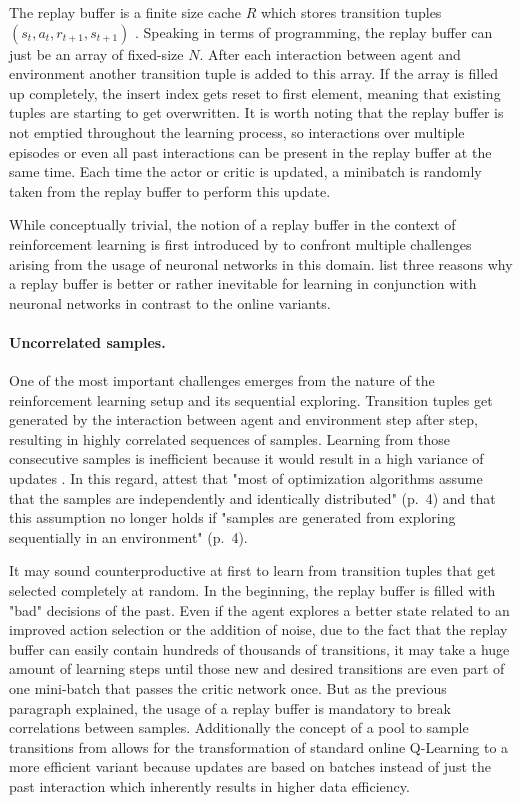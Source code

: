 The replay buffer is a finite size cache $R$ which stores transition tuples $(s_t, a_t, r_{t+1},s_{t+1})$ \cite[p.~4]{mnih2013playing}. Speaking in terms of programming, the replay buffer can just be an array of fixed-size $N$. After each interaction between agent and environment another transition tuple is added to this array. If the array is filled up completely, the insert index gets reset to first element, meaning that existing tuples are starting to get overwritten. It is worth noting that the replay buffer is not emptied throughout the learning process, so interactions over multiple episodes or even all past interactions can be present in the replay buffer at the same time. Each time the actor or critic is updated, a minibatch is randomly taken from the replay buffer to perform this update.
\par 
While conceptually trivial, the notion of a replay buffer in the context of reinforcement learning is first introduced by \cite{lin1992reinforcement} to confront multiple challenges arising from the usage of neuronal networks in this domain. \cite{mnih2013playing} list three reasons why a replay buffer is better or rather inevitable for learning in conjunction with neuronal networks in contrast to  the online variants.
\paragraph{Uncorrelated samples.} One of the most important  challenges emerges from the nature of the reinforcement learning setup and its sequential exploring.  Transition tuples get generated by the interaction between agent and environment step after step, resulting in highly correlated sequences of samples. Learning from those consecutive samples is inefficient because it would result in a high variance of updates \cite[p.~5]{mnih2013playing}. In this regard, \cite{lillicrap2019continuous} attest that "most of optimization algorithms assume that the samples are independently and identically distributed" (p.~4) and that this assumption no longer holds if "samples are generated from exploring sequentially in an environment" (p.~4).
\par
It may sound counterproductive at first to learn from transition tuples that get selected completely at random. In the beginning, the replay buffer is filled with "bad" decisions of the past. Even if the agent explores a better state related to an improved action selection or the addition of noise, due to the fact that the replay buffer can easily contain hundreds of thousands of transitions, it may take a huge amount of learning steps until those new and desired transitions are even part of one mini-batch that passes the critic network once. But as the previous paragraph explained, the usage of a replay buffer is mandatory to break correlations between samples. Additionally the concept of a pool to sample transitions from allows for the transformation of standard online Q-Learning to a more efficient variant because updates are based on batches instead of just the past interaction which inherently results in higher data efficiency.


